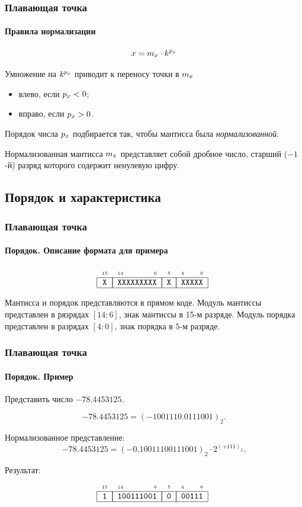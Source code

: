 \begin{frame}
    \frametitle{Плавающая точка}
    \framesubtitle{Правила нормализации}

    \[x = m_{x}\cdot {k}^{p_{x}}\]
    
    Умножение на $k^{p_{x}}$ приводит к переносу точки в $m_{x}$
    \begin{itemize}
        \item влево, если $p_{x} < 0$;
        \item вправо, если $p_{x} > 0$.
    \end{itemize}
    
    Порядок числа $p_{x}$ подбирается так, чтобы мантисса была \emph{нормализованной}.
    
    \begin{block}{}
        Нормализованная мантисса $m_{x}$ представляет собой дробное число, старший ($-1$-й) разряд которого содержит ненулевую цифру.
    \end{block}
\end{frame}

    
\subsection{Порядок и характеристика}

\begin{frame}
    \frametitle{Плавающая точка}
    \framesubtitle{Порядок. Описание формата для примера}
    
    \[
        \FloatMyHex{X}{XXXXXXXXX}{X}{XXXXX}
    \]
    
    Мантисса и порядок представляются в прямом коде. Модуль мантиссы представлен в рязрядах $[14:6]$, знак мантиссы в 15-м разряде. Модуль порядка представлен в разрядах $[4:0]$, знак порядка в $5$-м разряде.
\end{frame}

\begin{frame}
    \frametitle{Плавающая точка}
    \framesubtitle{Порядок. Пример}
    
    Представить число $-78.4453125$.
    
    \[-78.4453125 = (-1001110.0111001)_2.\]
    
    Нормализованное представление:
    \[-78.4453125 = (-0.10011100111001)_2\cdot 2^{(+111)_2}.\]

   Результат:
    \[
        \FloatMyHex{1}{100111001}{0}{00111}
    \]
\end{frame}

